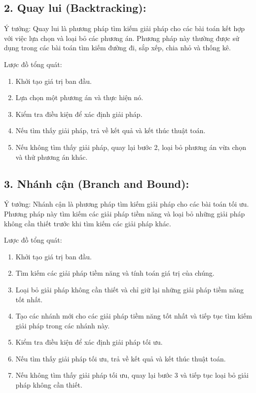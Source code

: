 \documentclass[
]{article}
\providecommand{\tightlist}{%
  \setlength{\itemsep}{0pt}\setlength{\parskip}{0pt}}
\begin{document}
\hypertarget{quay-lui-backtracking}{%
\subsection{2. Quay lui (Backtracking):}\label{quay-lui-backtracking}}

Ý tưởng: Quay lui là phương pháp tìm kiếm giải pháp cho các bài toán kết
hợp với việc lựa chọn và loại bỏ các phương án. Phương pháp này thường
được sử dụng trong các bài toán tìm kiếm đường đi, sắp xếp, chia nhỏ và
thống kê.

Lược đồ tổng quát:

\begin{enumerate}
\def\labelenumi{\arabic{enumi}.}
\tightlist
\item
  Khởi tạo giá trị ban đầu.
\item
  Lựa chọn một phương án và thực hiện nó.
\item
  Kiểm tra điều kiện để xác định giải pháp.
\item
  Nếu tìm thấy giải pháp, trả về kết quả và kết thúc thuật toán.
\item
  Nếu không tìm thấy giải pháp, quay lại bước 2, loại bỏ phương án vừa
  chọn và thử phương án khác.
\end{enumerate}

\hypertarget{nhuxe1nh-cux1eadn-branch-and-bound}{%
\subsection{3. Nhánh cận (Branch and
Bound):}\label{nhuxe1nh-cux1eadn-branch-and-bound}}

Ý tưởng: Nhánh cận là phương pháp tìm kiếm giải pháp cho các bài toán
tối ưu. Phương pháp này tìm kiếm các giải pháp tiềm năng và loại bỏ
những giải pháp không cần thiết trước khi tìm kiếm các giải pháp khác.

Lược đồ tổng quát:

\begin{enumerate}
\def\labelenumi{\arabic{enumi}.}
\tightlist
\item
  Khởi tạo giá trị ban đầu.
\item
  Tìm kiếm các giải pháp tiềm năng và tính toán giá trị của chúng.
\item
  Loại bỏ giải pháp không cần thiết và chỉ giữ lại những giải pháp tiềm
  năng tốt nhất.
\item
  Tạo các nhánh mới cho các giải pháp tiềm năng tốt nhất và tiếp tục tìm
  kiếm giải pháp trong các nhánh này.
\item
  Kiểm tra điều kiện để xác định giải pháp tối ưu.
\item
  Nếu tìm thấy giải pháp tối ưu, trả về kết quả và kết thúc thuật toán.
\item
  Nếu không tìm thấy giải pháp tối ưu, quay lại bước 3 và tiếp tục loại
  bỏ giải pháp không cần thiết.
\end{enumerate}
\end{document}
